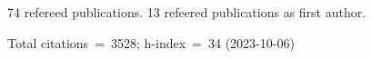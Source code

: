 74 refereed publications. 13 refeered publications as first author.

Total citations~=~3528; h-index~=~34 (2023-10-06)
